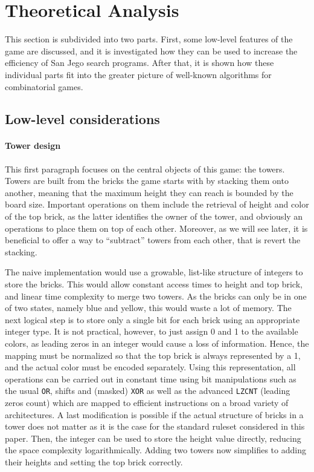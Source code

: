 \documentclass[sigconf]{acmart}
\begin{document}
\section{Theoretical Analysis}
This section is subdivided into two parts.
First, some low-level features of the game are discussed, and it is investigated how they can be used to increase the efficiency of San Jego search programs.
After that, it is shown how these individual parts fit into the greater picture of well-known algorithms for combinatorial games.

\subsection{Low-level considerations}\label{subsec:low-level}
\paragraph{Tower design}
This first paragraph focuses on the central objects of this game: the towers.
Towers are built from the bricks the game starts with by stacking them onto another, meaning that the maximum height they can reach is bounded by the board size.
Important operations on them include the retrieval of height and color of the top brick, as the latter identifies the owner of the tower, and obviously an operations to place them on top of each other.
Moreover, as we will see later, it is beneficial to offer a way to \enquote{subtract} towers from each other, that is revert the stacking.

The naive implementation would use a growable, list-like structure of integers to store the bricks.
This would allow constant access times to height and top brick, and linear time complexity to merge two towers.
As the bricks can only be in one of two states, namely blue and yellow, this would waste a lot of memory.
The next logical step is to store only a single bit for each brick using an appropriate integer type.
It is not practical, however, to just assign 0 and 1 to the available colors, as leading zeros in an integer would cause a loss of information.
Hence, the mapping must be normalized so that the top brick is always represented by a 1, and the actual color must be encoded separately.
Using this representation, all operations can be carried out in constant time using bit manipulations such as the usual \texttt{OR}, shifts and (masked) \texttt{XOR} as well as the advanced \texttt{LZCNT} (leading zeros count) which are mapped to efficient instructions on a broad variety of architectures.
A last modification is possible if the actual structure of bricks in a tower does not matter as it is the case for the standard ruleset considered in this paper.
Then, the integer can be used to store the height value directly, reducing the space complexity logarithmically.
Adding two towers now simplifies to adding their heights and setting the top brick correctly.
\end{document}
